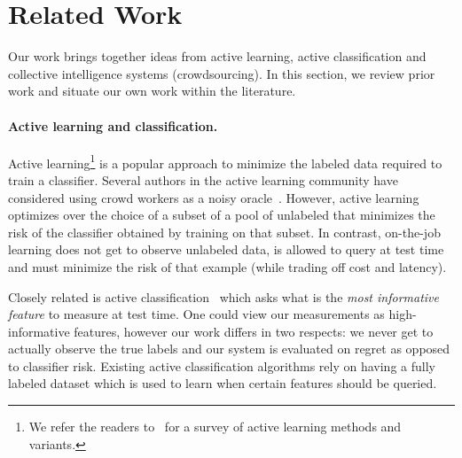 \section{Related Work}
\label{sec:related}

Our work brings together ideas from active learning, active classification and collective intelligence systems (crowdsourcing).
In this section, we review prior work and situate our own work within the literature.

\paragraph{Active learning and classification.}
Active learning\footnote{We refer the readers to~\cite{settles2010active} for a survey of active learning methods and variants.} is a popular approach to minimize the labeled data required to train a classifier. 
Several authors in the active learning community have considered using crowd workers as a noisy oracle~\cite{yan2011active,vijayanarasimhan2014large}.
However, active learning optimizes over the choice of a subset of a pool of unlabeled that minimizes the risk of the classifier obtained by training on that subset. 
In contrast, on-the-job learning does not get to observe unlabeled data, is allowed to query at test time and must minimize the risk of that example (while trading off cost and latency).

Closely related is active classification~\cite{greiner2002learning,chai2004test,esmeir2007anytime} which asks what is the {\em most informative feature\/} to measure at test time.
One could view our measurements as high-informative features, however our work differs in two respects: we never get to actually observe the true labels and our system is evaluated on regret as opposed to classifier risk.
Existing active classification algorithms rely on having a fully labeled dataset which is used to learn when certain features should be queried.

